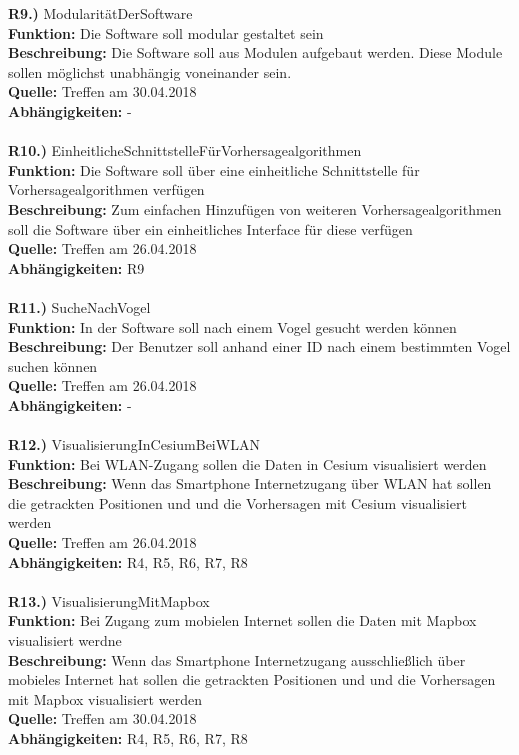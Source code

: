 \documentclass{article}
\begin{document}
	
	\textbf{R9.)} ModularitätDerSoftware\\
	\textbf{Funktion:} Die Software soll modular gestaltet sein\\
	\textbf{Beschreibung:} Die Software soll aus Modulen aufgebaut werden. Diese Module sollen möglichst unabhängig voneinander sein.\\
	\textbf{Quelle:} Treffen am 30.04.2018\\
	\textbf{Abhängigkeiten:} -\\\\
	
	\textbf{R10.)} EinheitlicheSchnittstelleFürVorhersagealgorithmen\\
	\textbf{Funktion:} Die Software soll über eine einheitliche Schnittstelle für Vorhersagealgorithmen verfügen\\
	\textbf{Beschreibung:} Zum einfachen Hinzufügen von weiteren Vorhersagealgorithmen soll die Software über ein einheitliches Interface für diese verfügen\\
	\textbf{Quelle:} Treffen am 26.04.2018\\
	\textbf{Abhängigkeiten:} R9\\\\
	
	\textbf{R11.)} SucheNachVogel\\
	\textbf{Funktion:} In der Software soll nach einem Vogel gesucht werden können\\
	\textbf{Beschreibung:} Der Benutzer soll anhand einer ID nach einem bestimmten Vogel suchen können\\
	\textbf{Quelle:} Treffen am 26.04.2018\\
	\textbf{Abhängigkeiten:} -\\\\
	
	\textbf{R12.)} VisualisierungInCesiumBeiWLAN\\
	\textbf{Funktion:} Bei WLAN-Zugang sollen die Daten in Cesium visualisiert werden\\
	\textbf{Beschreibung:} Wenn das Smartphone Internetzugang über WLAN hat sollen die getrackten Positionen und und die Vorhersagen mit Cesium visualisiert werden\\
	\textbf{Quelle:} Treffen am 26.04.2018\\
	\textbf{Abhängigkeiten:} R4, R5, R6, R7, R8\\\\
	
	\textbf{R13.)} VisualisierungMitMapbox\\
	\textbf{Funktion:} Bei Zugang zum mobielen Internet sollen die Daten mit Mapbox visualisiert werdne\\
	\textbf{Beschreibung:} Wenn das Smartphone Internetzugang ausschließlich über mobieles Internet hat sollen die getrackten Positionen und und die Vorhersagen mit Mapbox visualisiert werden\\
	\textbf{Quelle:} Treffen am 30.04.2018\\
	\textbf{Abhängigkeiten:} R4, R5, R6, R7, R8\\\\
	
\end{document}

